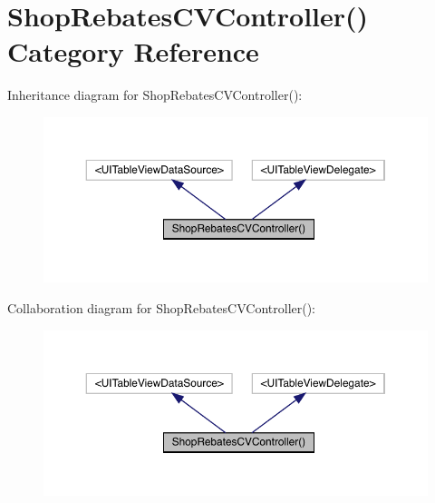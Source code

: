 \hypertarget{category_shop_rebates_c_v_controller_07_08}{}\section{Shop\+Rebates\+C\+V\+Controller() Category Reference}
\label{category_shop_rebates_c_v_controller_07_08}


Inheritance diagram for Shop\+Rebates\+C\+V\+Controller()\+:\nopagebreak
\begin{figure}[H]
\begin{center}
\leavevmode
\includegraphics[width=350pt]{category_shop_rebates_c_v_controller_07_08__inherit__graph}
\end{center}
\end{figure}


Collaboration diagram for Shop\+Rebates\+C\+V\+Controller()\+:\nopagebreak
\begin{figure}[H]
\begin{center}
\leavevmode
\includegraphics[width=350pt]{category_shop_rebates_c_v_controller_07_08__coll__graph}
\end{center}
\end{figure}
